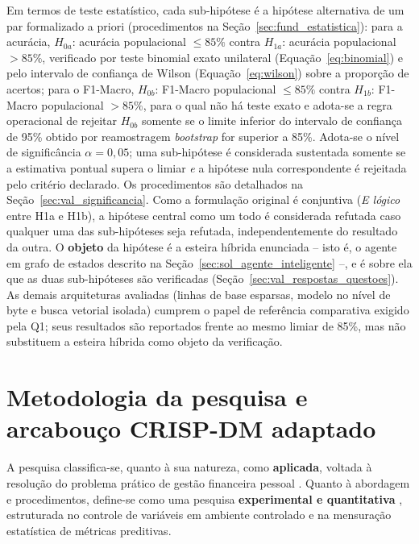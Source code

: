 Em termos de teste estatístico, cada sub-hipótese é a hipótese alternativa de um par formalizado a priori (procedimentos na Seção~\ref{sec:fund_estatistica}): para a acurácia, $H_{0a}$: acurácia populacional $\le 85\%$ contra $H_{1a}$: acurácia populacional $> 85\%$, verificado por teste binomial exato unilateral (Equação~\ref{eq:binomial}) e pelo intervalo de confiança de Wilson (Equação~\ref{eq:wilson}) sobre a proporção de acertos; para o F1-Macro, $H_{0b}$: F1-Macro populacional $\le 85\%$ contra $H_{1b}$: F1-Macro populacional $> 85\%$, para o qual não há teste exato e adota-se a regra operacional de rejeitar $H_{0b}$ somente se o limite inferior do intervalo de confiança de 95\% obtido por reamostragem \textit{bootstrap} for superior a 85\%. Adota-se o nível de significância $\alpha = 0{,}05$; uma sub-hipótese é considerada sustentada somente se a estimativa pontual supera o limiar \textit{e} a hipótese nula correspondente é rejeitada pelo critério declarado. Os procedimentos são detalhados na Seção~\ref{sec:val_significancia}. Como a formulação original é conjuntiva (\textit{E lógico} entre H1a e H1b), a hipótese central como um todo é considerada refutada caso qualquer uma das sub-hipóteses seja refutada, independentemente do resultado da outra. O \textbf{objeto} da hipótese é a esteira híbrida enunciada -- isto é, o agente em grafo de estados descrito na Seção~\ref{sec:sol_agente_inteligente} --, e é sobre ela que as duas sub-hipóteses são verificadas (Seção~\ref{sec:val_respostas_questoes}). As demais arquiteturas avaliadas (linhas de base esparsas, modelo no nível de byte e busca vetorial isolada) cumprem o papel de referência comparativa exigido pela Q1; seus resultados são reportados frente ao mesmo limiar de 85\%, mas não substituem a esteira híbrida como objeto da verificação.

\section{Metodologia da pesquisa e arcabouço CRISP-DM adaptado}
\label{sec:sol_crisp_dm}

A pesquisa classifica-se, quanto à sua natureza, como \textbf{aplicada}, voltada à resolução do problema prático de gestão financeira pessoal \cite{gerhardt2009metodos}. Quanto à abordagem e procedimentos, define-se como uma pesquisa \textbf{experimental e quantitativa} \cite{gil2019metodos}, estruturada no controle de variáveis em ambiente controlado e na mensuração estatística de métricas preditivas.

